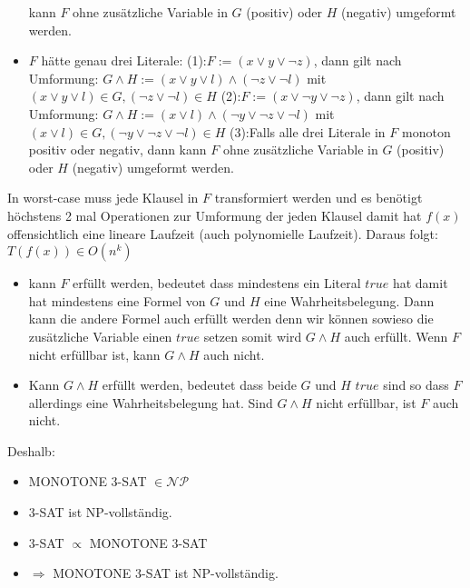 \documentclass{article}
\begin{document}
\begin{flushleft}
\begin{itemize}
    kann $F$ ohne zusätzliche Variable in $G$ (positiv) oder $H$ (negativ) umgeformt werden.
    \item $F$ hätte genau drei Literale:
    \newline
    (1):$F := (x \lor y \lor \lnot z)$, dann gilt nach Umformung: $G \land H := (x \lor y \lor l) \land (\lnot z \lor \lnot l)$ mit 
    $(x \lor y \lor l) \in G, (\lnot z \lor \lnot l) \in H$ 
    \newline
    (2):$F := (x \lor \lnot y \lor \lnot z)$, dann gilt nach Umformung: $G \land H := (x \lor l) \land (\lnot y \lor \lnot z \lor \lnot l)$
    mit $(x \lor l) \in G, (\lnot y \lor \lnot z \lor \lnot l) \in H$ 
    \newline
    (3):Falls alle drei Literale in $F$ monoton positiv oder negativ, dann 
    kann $F$ ohne zusätzliche Variable in $G$ (positiv) oder $H$ (negativ) umgeformt werden. 
\end{itemize}
In worst-case muss jede Klausel in $F$ transformiert werden und es benötigt höchstens 2 mal Operationen zur 
Umformung der jeden Klausel damit hat $f(x)$ offensichtlich eine lineare Laufzeit (auch polynomielle Laufzeit). 
\newline
Daraus folgt: $T(f(x)) \in O(n^k)$
\begin{itemize}
    \item kann $F$ erfüllt werden, bedeutet dass mindestens ein Literal $true$ hat damit hat mindestens eine Formel von $G$ und $H$ eine
    Wahrheitsbelegung. Dann kann die andere Formel auch erfüllt werden denn wir können sowieso die zusätzliche Variable einen $true$
    setzen somit wird $G \land H$ auch erfüllt. Wenn $F$ nicht erfüllbar ist, kann $G \land H$ auch nicht.
    \item Kann $G \land H$ erfüllt werden, bedeutet dass beide $G$ und $H$ $true$ sind so dass $F$ allerdings eine Wahrheitsbelegung hat.
    Sind $G \land H$ nicht erfüllbar, ist $F$ auch nicht.
\end{itemize}
Deshalb:
\begin{itemize}
    \item MONOTONE 3-SAT $\in \mathcal{N} \mathcal{P}$
    \item 3-SAT ist NP-vollständig.
    \item 3-SAT $\propto$ MONOTONE 3-SAT
    \item $\Longrightarrow$ MONOTONE 3-SAT ist NP-vollständig.
\end{itemize}
\end{flushleft}
\end{document}
